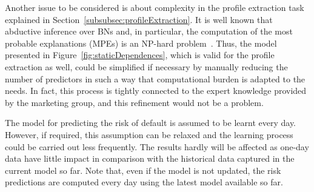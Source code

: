 
Another issue to be considered is about complexity in the profile extraction task explained in Section~\ref{subsubsec:profileExtraction}. It is well known that abductive inference over BNs and, in particular, the computation of the most probable explanations (MPEs) is an NP-hard problem~\cite{Shi94}. Thus, the model presented in Figure~\ref{fig:staticDependences}, which is valid for the profile extraction as well, could be simplified if necessary
by manually reducing the number of predictors in such a way that computational burden is adapted to the needs. In fact, this process is tightly connected to the expert knowledge provided by the marketing group, and this refinement would not be a problem.


The model for predicting the risk of default is assumed to be learnt every day. However, if required, this assumption can be relaxed and the learning process could be carried out less frequently. The results hardly will be affected as one-day data have little impact in comparison with the historical data captured in the current model so far. Note that, even if the model is not updated, the risk predictions are computed every day using the latest model available so far.



